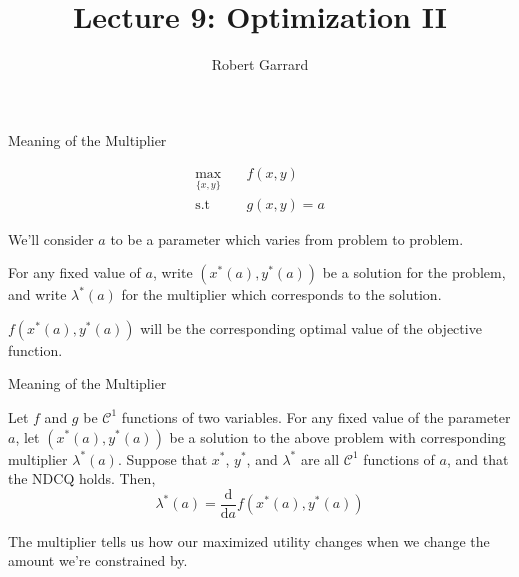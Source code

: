 \documentclass[11pt, xcolor={dvipsnames}, hyperref={colorlinks, allcolors=Blue}]{beamer}
\title[ECON 8000 -  Lecture 9]{Lecture 9: Optimization II}
\author[University of Queensland]{Robert Garrard}
\date[\today]{}
\begin{document}
\begin{frame}
\titlepage


\end{frame}

\begin{frame}{Meaning of the Multiplier}


\begin{align*}
\underset{\{x, y\}}{\mathrm{max}}  \quad& f(x, y)\\
\text{s.t}\quad \ \ & g(x, y) = a
\end{align*}

We'll consider $a$ to be a parameter which varies from problem to problem.\bigskip

 For any fixed value of $a$, write $\left(x^{*}(a), y^{*}(a)\right)$ be a solution for the problem, and write $\lambda^{*}(a)$ for the multiplier which corresponds to the solution. \bigskip

$f\left(x^{*}(a), y^{*}(a)\right)$ will be the corresponding optimal value of the objective function. 


\end{frame}

\begin{frame}{Meaning of the Multiplier}
\begin{theorem}
Let $f$ and $g$ be $\mathcal{C}^{1}$ functions of two variables. For any fixed value of the parameter $a$, let $\left(x^{*}(a), y^{*}(a)\right)$ be a solution to the above problem with corresponding multiplier $\lambda^{*}(a)$. Suppose that $x^{*}$, $y^{*}$, and $\lambda^{*}$ are all $\mathcal{C}^{1}$ functions of $a$, and that the NDCQ holds. Then,
\[\lambda^{*}(a) = \frac{\mathrm{d}}{\mathrm{d}a} f\left(x^{*}(a), y^{*}(a)\right)\]
\end{theorem}

The multiplier tells us how our maximized utility changes when we change the amount we're constrained by.
\end{frame}
\end{document}
